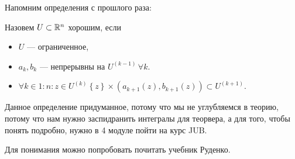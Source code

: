 Напомним определения с прошлого раза:
\begin{definition}
    Назовем $U \subset \mathbb{R}^n$ хорошим, если
     \begin{itemize}
        \item $U$ --- ограниченное,
        \item  $a_k, b_k$ --- непрерывны на  $U^{(k - 1)}\, \forall k$.
        \item  $\forall k \in 1:n\!: z \in U^{(k)} \left\{ z \right\} \times \left( a_{k+1}(z), b_{k+1}(z) \right) \subset U^{(k+1)}$.
    \end{itemize}
\end{definition}
Данное определение придуманное, потому что мы не углубляемся в теорию, потому что нам нужно заспидранить интегралы для теорвера, а для того, чтобы понять подробно, нужно в 4 модуле пойти на курс JUB.

Для понимания можно попробовать почитать учебник Руденко.

